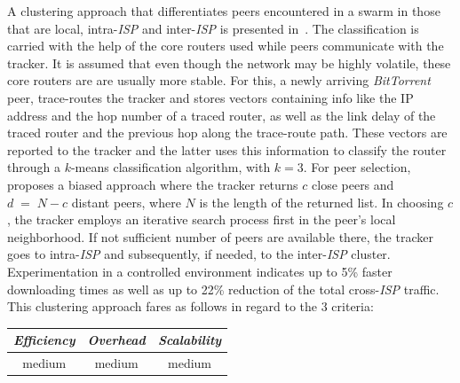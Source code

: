 A clustering approach that differentiates peers encountered in a swarm
in those that are local, intra-\emph{ISP} and inter-\emph{ISP} is 
presented in~\cite{QLZG2009}.
The classification is carried with the help of the core routers used 
while peers communicate with the tracker. It is assumed that even though the
network may be highly volatile, these core routers are are usually more stable.
For this, a newly arriving
{\sl BitTorrent} peer, trace-routes the tracker and stores vectors containing
info like the IP address and the hop number of a traced router, as well as the
link delay of the traced router and the previous hop along the trace-route path.
These vectors are reported to the tracker and the latter uses this information
to classify the router through a $k$-means classification algorithm, with $k = 3$. 
For peer selection, \cite{QLZG2009} proposes a biased approach 
where the tracker returns $c$ close peers 
and $d\;=\;N-c$ distant peers, where $N$ is the length of the returned list. 
In choosing $c$, the tracker employs an iterative search process
first in the peer's local neighborhood. If not sufficient number of 
peers are available there, the tracker goes to intra-\emph{ISP} 
and subsequently, if needed, to the inter-\emph{ISP} cluster. 
Experimentation in a controlled environment indicates up to
5\% faster downloading times as well as up to 22\% reduction of 
the total cross-\emph{ISP} traffic.
This clustering approach fares as follows in regard 
to the $3$ criteria:
\begin{center}
{\footnotesize
\begin{tabular}{ccc}
\emph{Efficiency} & \emph{Overhead} & \emph{Scalability} \\
\hline
medium &
medium &
medium
\end{tabular}
}
\end{center}

